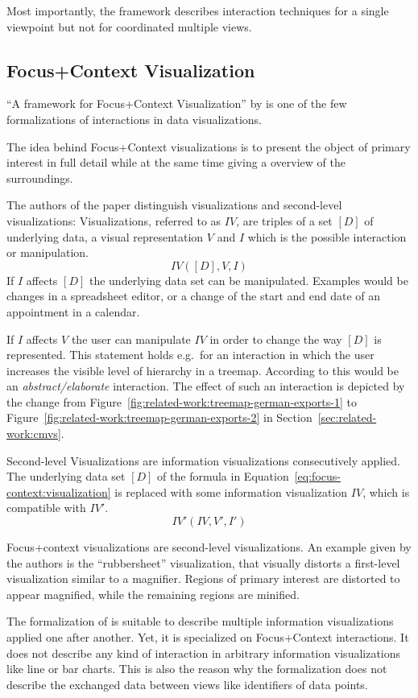 Most importantly, the framework describes interaction techniques for a single viewpoint but not for coordinated multiple views.

\subsection{Focus+Context Visualization}
``A framework for Focus+Context Visualization'' by \textcite{Bjork1999} is one of the few formalizations of interactions in data visualizations.

The idea behind Focus+Context visualizations is to present the object of primary interest in full detail while at the same time giving a overview of the surroundings.

The authors of the paper distinguish visualizations and second-level visualizations:
Visualizations, referred to as $IV$, are triples of a set $[D]$ of underlying data, a visual representation $V$ and $I$ which is the possible interaction or manipulation.
\begin{equation}
  IV([D], V, I)
  \label{eq:focus-context:visualization}
\end{equation}
If $I$ affects $[D]$ the underlying data set can be manipulated.
Examples would be changes in a spreadsheet editor, or a change of the start and end date of an appointment in a calendar.

If $I$ affects $V$ the user can manipulate $IV$ in order to change the way $[D]$ is represented.
This statement holds e.g.\ for an interaction in which the user increases the visible level of hierarchy in a treemap.
According to \textcite{Yi2007} this would be an \emph{abstract/elaborate} interaction.
The effect of such an interaction is depicted by the change from Figure~\ref{fig:related-work:treemap-german-exports-1} to Figure~\ref{fig:related-work:treemap-german-exports-2} in Section~\ref{sec:related-work:cmvs}.

Second-level Visualizations are information visualizations consecutively applied.
The underlying data set $[D]$ of the formula in Equation~\ref{eq:focus-context:visualization} is replaced with some information visualization $IV$, which is compatible with $IV'$.
\begin{equation}
  IV'(IV, V', I')
\end{equation}

Focus+context visualizations are second-level visualizations.
An example given by the authors is the  ``rubbersheet'' visualization, that visually distorts a first-level visualization similar to a magnifier.
Regions of primary interest are distorted to appear magnified, while the remaining regions are minified.

The formalization of \textcite{Bjork1999} is suitable to describe multiple information visualizations applied one after another.
Yet, it is specialized on Focus+Context interactions.
It does not describe any kind of interaction in arbitrary information visualizations like line or bar charts.
This is also the reason why the formalization does not describe the exchanged data between views like identifiers of data points.

